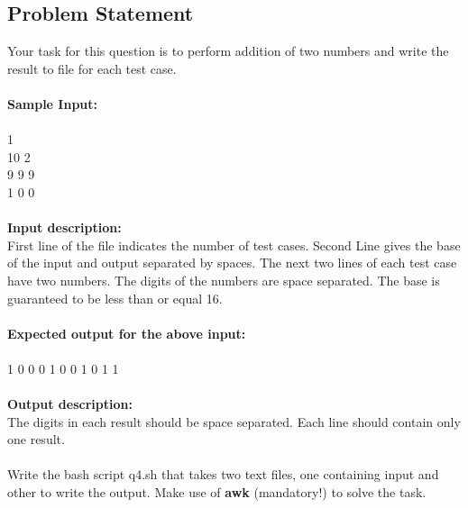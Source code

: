 \documentclass[12pt]{article}
\begin{document}
\subsection{Problem Statement}
Your task for this question is to perform addition of two numbers and 
write the result to file for each test case.\\\\
\textbf{Sample Input:}\\\\
1
\\
10 2
\\
9 9 9
\\
1 0 0
\\
\\
\textbf{Input description:}
\\
First line of the file indicates the number of test cases.
Second Line gives the base of the input and output separated by spaces. 
The next two lines of each test case have two numbers. 
The digits of the numbers are space separated. 
The base is guaranteed to be less than or equal 16.
\\\\
\textbf{Expected output for the above input:}
\\\\
1 0 0 0 1 0 0 1 0 1 1
\\\\
\textbf{Output description:}
\\
The digits in each result should be space separated. 
Each line should contain only one result.\\\\
Write the bash script q4.sh that takes two text files, one containing input and 
other to write the output. 
Make use of \textbf{awk} (mandatory!) to solve the task.
\\\\\\\\\\\\
\end{document}
